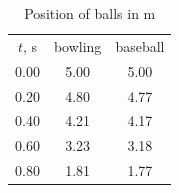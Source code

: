 \begin{table}
  \caption{Position of balls in \unit{\meter}}
  \label{tab:3}
  \begin{ruledtabular}
    \begin{tabular}{ccc}
      $t$, \unit{\second} & bowling & baseball \\
      \colrule
      \num{0.00} & \num{5.00} & \num{5.00} \\
      \num{0.20} & \num{4.80} & \num{4.77} \\
      \num{0.40} & \num{4.21} & \num{4.17} \\
      \num{0.60} & \num{3.23} & \num{3.18} \\
      \num{0.80} & \num{1.81} & \num{1.77} \\
    \end{tabular}
  \end{ruledtabular}
\end{table}
